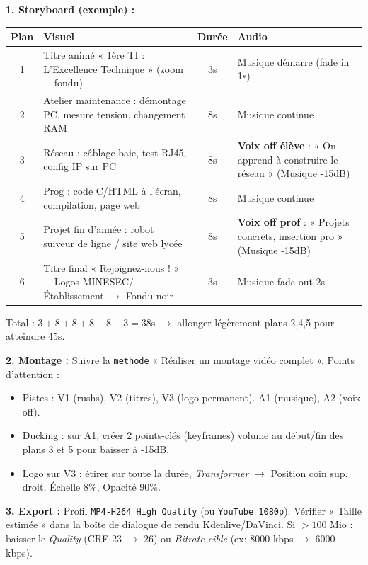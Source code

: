 \documentclass[11pt]{article}
\begin{document}
\begin{corrige}
\textbf{1. Storyboard (exemple) :}
\begin{center}
\begin{tabularx}{\linewidth}{|c|X|c|X|}
\hline
\textbf{Plan} & \textbf{Visuel} & \textbf{Durée} & \textbf{Audio} \\
\hline
1 & Titre animé « 1ère TI : L'Excellence Technique » (zoom + fondu) & 3s & Musique démarre (fade in 1s) \\
\hline
2 & Atelier maintenance : démontage PC, mesure tension, changement RAM & 8s & Musique continue \\
\hline
3 & Réseau : câblage baie, test RJ45, config IP sur PC & 8s & \textbf{Voix off élève} : « On apprend à construire le réseau » (Musique -15dB) \\
\hline
4 & Prog : code C/HTML à l'écran, compilation, page web & 8s & Musique continue \\
\hline
5 & Projet fin d'année : robot suiveur de ligne / site web lycée & 8s & \textbf{Voix off prof} : « Projets concrets, insertion pro » (Musique -15dB) \\
\hline
6 & Titre final « Rejoignez-nous ! » + Logos MINESEC/Établissement $\to$ Fondu noir & 3s & Musique fade out 2s \\
\hline
\end{tabularx}
\end{center}
Total : $3+8+8+8+8+3 = 38$s $\to$ allonger légèrement plans 2,4,5 pour atteindre 45s.

\textbf{2. Montage :} Suivre la \texttt{methode} « Réaliser un montage vidéo complet ». Points d'attention :
\begin{itemize}
  \item Pistes : V1 (rushs), V2 (titres), V3 (logo permanent). A1 (musique), A2 (voix off).
  \item Ducking : sur A1, créer 2 points-clés (keyframes) volume au début/fin des plans 3 et 5 pour baisser à -15dB.
  \item Logo sur V3 : étirer sur toute la durée, \emph{Transformer} $\to$ Position coin sup. droit, Échelle 8\%, Opacité 90\%.
\end{itemize}

\textbf{3. Export :} Profil \texttt{MP4-H264 High Quality} (ou \texttt{YouTube 1080p}). Vérifier « Taille estimée » dans la boîte de dialogue de rendu Kdenlive/DaVinci. Si $> 100$ Mio : baisser le \emph{Quality} (CRF 23 $\to$ 26) ou \emph{Bitrate cible} (ex: 8000 kbps $\to$ 6000 kbps).


\end{corrige}
\end{document}
